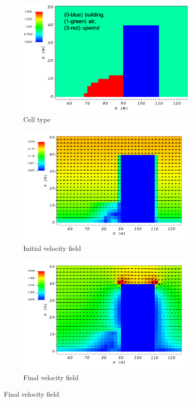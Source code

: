 \documentclass[14pt,landscape]{report}
\begin{document}
\begin{figure}[p]
    \centering
    \begin{subfigure}[t]{0.45\textwidth}
    \centering
    \includegraphics[width=10.3cm,keepaspectratio]{Images/upwind_y_100_3_init_icell.png}
    \caption{Cell type}
    \end{subfigure}
    \begin{subfigure}[t]{0.45\textwidth}
    \centering
    \includegraphics[width=11.0cm,keepaspectratio]{Images/upwind_y_100_3_init_vel.png}
    \caption{Initial velocity field}
    \end{subfigure}
    \begin{subfigure}[t]{0.45\textwidth}
    \centering
    \includegraphics[width=11.0cm,keepaspectratio]{Images/upwind_y_100_3_final.png}
    \caption{Final velocity field}
    \end{subfigure}
\end{figure}
\end{document}
